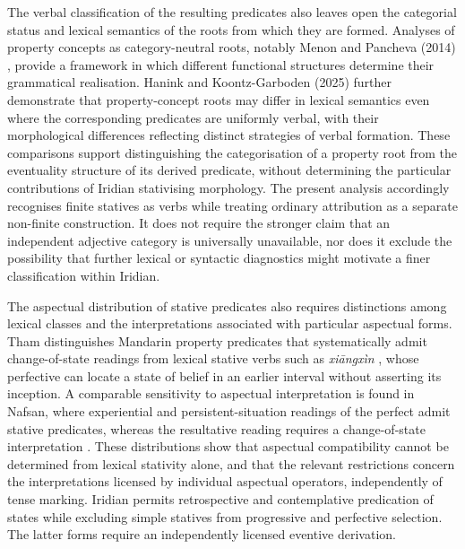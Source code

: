 The verbal classification of the resulting predicates also leaves open the
categorial status and lexical semantics of the roots from which they are
formed. Analyses of property concepts as category-neutral roots, notably
Menon and Pancheva (2014) \cite{menonpancheva2014}, provide a framework in
which different functional structures determine their grammatical realisation.
Hanink and Koontz-Garboden (2025) \cite[§1]{haninkkoontzgarboden2025}
further demonstrate that property-concept roots may differ in lexical semantics
even where the corresponding predicates are uniformly verbal, with their
morphological differences reflecting distinct strategies of verbal formation.
These comparisons support distinguishing the categorisation of a property root
from the eventuality structure of its derived predicate, without determining the
particular contributions of Iridian stativising morphology. The present
analysis accordingly recognises finite statives as verbs while treating
ordinary attribution as a separate non-finite construction. It does not require
the stronger claim that an independent adjective category is universally
unavailable, nor does it exclude the possibility that further lexical or
syntactic diagnostics might motivate a finer classification within Iridian.

The aspectual distribution of stative predicates also requires distinctions
among lexical classes and the interpretations associated with particular
aspectual forms. Tham \cite[§3.3, pp.~668--670]{tham2013cos} distinguishes
Mandarin property predicates that systematically admit change-of-state
readings from lexical stative verbs such as \textit{xiāngxìn}
, whose perfective can locate a state of belief in an earlier
interval without asserting its inception. A comparable sensitivity to
aspectual interpretation is found in Nafsan, where experiential and
persistent-situation readings of the perfect admit stative predicates,
whereas the resultative reading requires a change-of-state interpretation
\cite[§4.1]{krajinovicvanderklokvonprince2025}. These distributions show
that aspectual compatibility cannot be determined from lexical stativity
alone, and that the relevant restrictions concern the interpretations
licensed by individual aspectual operators, independently of tense marking.
Iridian permits retrospective and contemplative predication of states while
excluding simple statives from progressive and perfective selection. The
latter forms require an independently licensed eventive derivation.

